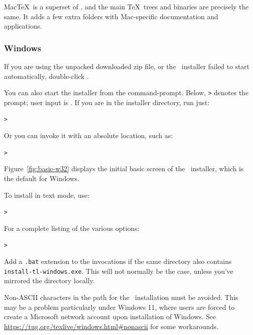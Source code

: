 \documentclass[12pt]{article}
\begin{document}
Mac\TeX\ is a superset of \TL, and the main \TeX\ trees and binaries
are precisely the same.  It adds a few extra folders with Mac-specific
documentation and applications.


\subsubsection{Windows}\label{sec:wininst}

If you are using the unpacked downloaded zip file, or the \DVD\
installer failed to start automatically, double-click
.

You can also start the installer from the command-prompt.  Below,
\texttt{>} denotes the prompt; user input is \Ucom{\texttt{bold}}.  If
you are in the installer directory, run just:
\begin{alltt}
> 
\end{alltt}

Or you can invoke it with an absolute location, such as:
\begin{alltt}
> 
\end{alltt}
Figure~\ref{fig:basic-w32} displays the initial basic screen of the
\GUI\ installer, which is the default for Windows.

To install in text mode, use:
\begin{alltt}
> 
\end{alltt}

For a complete listing of the various options:
\begin{alltt}
> 
\end{alltt}

Add a \texttt{.bat} extension to the invocations if the same directory
also contains \texttt{install-tl-windows.exe}. This will not
normally be the case, unless you've mirrored the  directory
locally.

Non-ASCII characters in the path for the \TL\ installation must be
avoided.  This may be a problem particularly under Windows 11, where
users are forced to create a Microsoft network account upon
installation of Windows.  See
\url{https://tug.org/texlive/windows.html\#nonascii} for some
workarounds.
\end{document}
